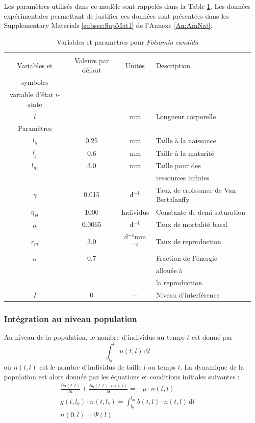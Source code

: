 Les paramètres utilisés dans ce modèle sont rappelés dans la Table
\ref{tab:ANparam}. Les données expérimentales permettant de justifier ces
données sont présentées dans les Supplementary Materials \ref{subsec:SupMat1} de
l'Annexe \ref{An:AmNat}. 

\begin{table}
\caption{\label{tab:ANparam}Variables et paramètres pour \textit{Folsomia
candida}}
\begin{tabular}{cccl}
\hline
\hline 
 & & &\\
 Variables et & Valeurs par défaut & Unités & Description\\ 
symboles & & &\\
\hline
	variable d'état $i$-state  & & & \\ 
	$l$ &   & mm & Longueur corporelle \\ 
	Paramètres & & & \\ 
	$l_{b}$ & 0.25 & mm & Taille à la naissance \\ 
	$l_{j}$ & 0.6 & mm & Taille à la maturité \\ 
	$l_{m}$ & 3.0 & mm & Taille pour des \\
	& & &  ressources infinies \\ 
	$\gamma$ & 0.015 & d$^{-1}$ & Taux de croissance de Van Bertalanffy  \\ 
	$\eta_{H}$ & 1000 & Individus & Constante de demi saturation \\ 
	$\mu$ & 0.0065 & d$^{-1}$ & Taux de mortalité basal \\ 
	$r_{m}$ & 3.0 & d$^{-1}$mm$^{-2}$ & Taux de reproduction \\ 
	$\kappa$ & 0.7 & -- & Fraction de l'énergie \\
	  &   &   & allouée à  \\
	  &   &   & la reproduction \\ 
	  $I$ & 0 & -- & Niveau d'interférence\\
\hline 
\end{tabular} 
\end{table}

\subsubsection{Intégration au niveau population}

Au niveau de la population, le nombre d'individus au temps $t$ est donné par
\begin{equation}
\label{eq_an5}
\int_{l_b}^{l_m}\!n(t,l)\,\mathrm{d}l
\end{equation}
où $n(t,l)$ est le nombre d'individus de taille $l$ au temps $t$. La dynamique
de la population est alors donnée par les équations et conditions initiales
suivantes \autocites{kooijman1984a,de-roos1997a}:
\begin{align}
\label{eq_an6}
\frac{\partial n(t,l)}{\partial t}+\frac{\partial g(t,l) \cdot n(t,l)}{\partial l}=-\mu \cdot n(t,l) \\
g(t,l_b) \cdot n(t,l_b)= \int_{l_b} ^{l_m} \! b(t,l)\cdot n(t,l)\, \mathrm{d}l
\\ n(0,l)=\Psi(l)
\end{align}

